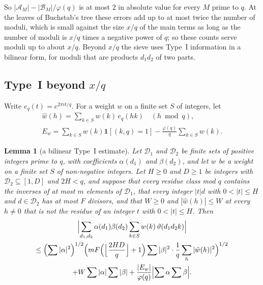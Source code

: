 \documentclass[11pt]{article}
\newtheorem{lemma}[theorem]{Lemma}
\theoremstyle{definition}
\begin{document}
So $|\mathcal A_M| - |\mathcal B_M|/\varphi(q)$ is at most $2$ in absolute value for every $M$ prime to $q$. At the
leaves of Buchstab's tree these errors add up to at most twice the number of moduli, which is small against the size
$x/q$ of the main terms as long as the number of moduli is $x/q$ times a negative power of $q$; so these counts serve
moduli up to about $x/q$. Beyond $x/q$
the sieve uses Type~I information in a bilinear form, for moduli that are products $d_1 d_2$ of two parts.

\subsection{Type~I beyond \texorpdfstring{$x/q$}{x/q}}

Write $e_q(t) = e^{2\pi i t/q}$. For a weight $w$ on a finite set $S$ of integers, let
\begin{gather*}
  \hat w(h) = \sum_{k \in S} w(k)\, e_q(hk) \quad (h \bmod q), \\
  E_w = \sum_{k \in S} w(k) \mathbf 1[(k, q) = 1] - \frac{\varphi(q)}{q} \sum_{k \in S} w(k).
\end{gather*}

\begin{lemma}[a bilinear Type~I estimate]\label{lem:typeIB}
Let $\mathcal D_1$ and $\mathcal D_2$ be finite sets of positive integers prime to $q$, with coefficients $\alpha(d_1)$
and $\beta(d_2)$, and let $w$ be a weight on a finite set $S$ of non-negative integers. Let $H \ge 0$ and $D \ge 1$ be
integers with
$\mathcal D_2 \subseteq [1, D]$ and $2H < q$, and suppose that every residue class mod $q$ contains the inverses of at
most $m$ elements of $\mathcal D_1$, that every integer $|t| d$ with $0 < |t| \le H$ and $d \in \mathcal D_2$ has at
most $F$ divisors, and that $W \ge 0$ and $|\hat w(h)| \le W$ at every $h \ne 0$ that is not the residue of an integer
$t$ with $0 < |t| \le H$. Then
\begin{multline*}
  \Bigl|\sum_{d_1, d_2} \alpha(d_1) \beta(d_2) \sum_{k \in S} w(k)\, \vartheta(d_1 d_2 k)\Bigr| \\
  \le \Bigl(\sum |\alpha|^2\Bigr)^{1/2} \Bigl(mF\Bigl(\Bigl\lfloor \frac{2HD}q \Bigr\rfloor + 1\Bigr) \sum |\beta|^2
  \cdot \frac1q \sum_h |\hat w(h)|^2\Bigr)^{1/2} \\
  + W \sum |\alpha| \sum |\beta| + \frac{|E_w|}{\varphi(q)} \Bigl|\sum \alpha \sum \beta\Bigr|.
\end{multline*}
\end{lemma}
\end{document}
